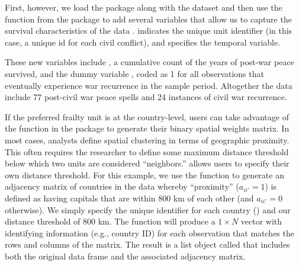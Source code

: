 First, however, we load the  package along with the dataset and then use the  function from the  package to add several variables that allow us to capture the survival characteristics of the data \citep{beger2017splitting}.  indicates the unique unit identifier (in this case, a unique id for each civil conflict), and   specifies the temporal variable.


\noindent These new variables include , a cumulative count of the years of post-war peace survived, and the dummy variable , coded as 1 for all observations that eventually experience war recurrence in the sample period. Altogether the data include 77 post-civil war peace spells and 24 instances of civil war recurrence. 

If the preferred frailty unit is at the country-level, users can take advantage of the  function in the  package to generate their binary spatial weights matrix. In most cases, analysts define spatial clustering in terms of geographic proximity. This often requires the researcher to define some maximum distance threshold below which two units are considered ``neighbors.''  allows users to specify their own distance threshold. For this example, we use the  function to generate an adjacency matrix of countries in the data whereby “proximity” ($a_{ii'} = 1$) is defined as having capitals that are within 800 km of each other (and $a_{ii'} = 0$ otherwise). We simply specify the unique identifier for each country () and our distance threshold of 800 km. The  function will produce a $1 \times N$ vector with identifying information (e.g., country ID) for each observation that matches the  rows and columns of the matrix. The result is a list object called  that includes both the original data frame and the associated adjacency matrix.

